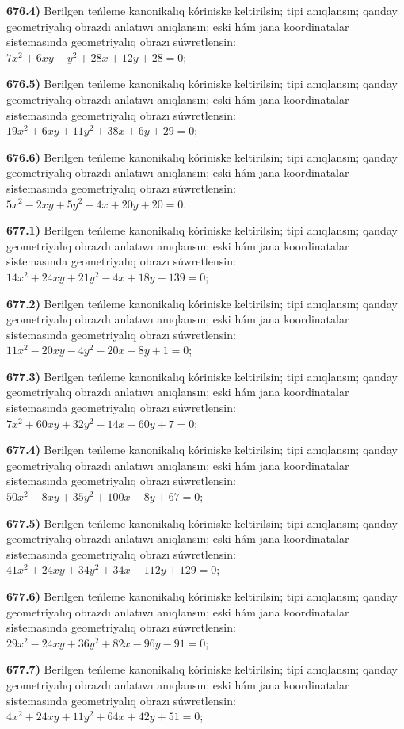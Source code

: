 \textbf{676.4)} Berilgen teńleme kanonikalıq kóriniske keltirilsin; tipi anıqlansın; qanday geometriyalıq obrazdı anlatıwı anıqlansın; eski hám jana koordinatalar sistemasında geometriyalıq obrazı súwretlensin:$7 x^2+6 x y-y^2+28 x+12 y+28=0$;

\textbf{676.5)} Berilgen teńleme kanonikalıq kóriniske keltirilsin; tipi anıqlansın; qanday geometriyalıq obrazdı anlatıwı anıqlansın; eski hám jana koordinatalar sistemasında geometriyalıq obrazı súwretlensin:$19 x^2+6 x y+11 y^2+38 x+6 y+29=0$;

\textbf{676.6)} Berilgen teńleme kanonikalıq kóriniske keltirilsin; tipi anıqlansın; qanday geometriyalıq obrazdı anlatıwı anıqlansın; eski hám jana koordinatalar sistemasında geometriyalıq obrazı súwretlensin:$5 x^2-2 x y+5 y^2-4 x+20 y+20=0$.

\textbf{677.1)} Berilgen teńleme kanonikalıq kóriniske keltirilsin; tipi anıqlansın; qanday geometriyalıq obrazdı anlatıwı anıqlansın; eski hám jana koordinatalar sistemasında geometriyalıq obrazı súwretlensin:$14 x^2+24 x y+21 y^2-4 x+18 y-139=0$;

\textbf{677.2)} Berilgen teńleme kanonikalıq kóriniske keltirilsin; tipi anıqlansın; qanday geometriyalıq obrazdı anlatıwı anıqlansın; eski hám jana koordinatalar sistemasında geometriyalıq obrazı súwretlensin:$11 x^2-20 x y-4 y^2-20 x-8 y+1=0$;

\textbf{677.3)} Berilgen teńleme kanonikalıq kóriniske keltirilsin; tipi anıqlansın; qanday geometriyalıq obrazdı anlatıwı anıqlansın; eski hám jana koordinatalar sistemasında geometriyalıq obrazı súwretlensin:$7 x^2+60 x y+32 y^2-14 x-60 y+7=0$;

\textbf{677.4)} Berilgen teńleme kanonikalıq kóriniske keltirilsin; tipi anıqlansın; qanday geometriyalıq obrazdı anlatıwı anıqlansın; eski hám jana koordinatalar sistemasında geometriyalıq obrazı súwretlensin:$50 x^2-8 x y+35 y^2+100 x-8 y+67=0$;

\textbf{677.5)} Berilgen teńleme kanonikalıq kóriniske keltirilsin; tipi anıqlansın; qanday geometriyalıq obrazdı anlatıwı anıqlansın; eski hám jana koordinatalar sistemasında geometriyalıq obrazı súwretlensin:$41 x^2+24 x y+34 y^2+34 x-112 y+129=0$;

\textbf{677.6)} Berilgen teńleme kanonikalıq kóriniske keltirilsin; tipi anıqlansın; qanday geometriyalıq obrazdı anlatıwı anıqlansın; eski hám jana koordinatalar sistemasında geometriyalıq obrazı súwretlensin:$29 x^2-24 x y+36 y^2+82 x-96 y-91=0$;

\textbf{677.7)} Berilgen teńleme kanonikalıq kóriniske keltirilsin; tipi anıqlansın; qanday geometriyalıq obrazdı anlatıwı anıqlansın; eski hám jana koordinatalar sistemasında geometriyalıq obrazı súwretlensin:$4 x^2+24 x y+11 y^2+64 x+42 y+51=0$;

